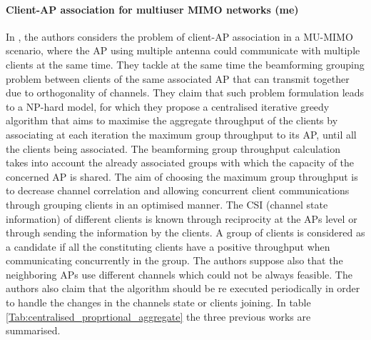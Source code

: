 \documentclass[journal,transmag]{IEEEtran}
\begin{document}
\paragraph{Client-AP association for multiuser MIMO networks (me)} In \cite{15AP_association_MIMO}, the authors considers the problem of client-AP association in a MU-MIMO scenario, where the AP using multiple antenna could communicate with multiple clients at the same time. They tackle at the same time the beamforming grouping problem between clients of the same associated AP that can transmit together due to orthogonality of channels. They claim that such problem formulation leads to a NP-hard model, for which they propose a centralised iterative greedy algorithm that aims to maximise the aggregate throughput of the clients by associating at each iteration the maximum group throughput to its AP, until all the clients being associated. The beamforming group throughput calculation takes into account the already associated groups with which the capacity of the concerned AP is shared. The aim of choosing the maximum group throughput is to decrease channel correlation and allowing concurrent client communications through grouping clients in an optimised manner. The CSI (channel state information) of different clients is known through reciprocity at the APs level or through sending the information by the clients. A group of clients is considered as a candidate if all the constituting clients have a positive throughput when communicating concurrently in the group. The authors suppose also that the neighboring APs use different channels which could not be always feasible. The authors also claim that the algorithm should be re executed periodically in order to handle the changes in the channels state or clients joining. In table \ref{Tab:centralised_proprtional_aggregate} the three previous works are summarised. \\
\end{document}
